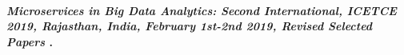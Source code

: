 
\paragraph{
    \textbf{\emph{Microservices in Big Data Analytics: Second International, {ICETCE} 2019, Rajasthan, India, February 1st-2nd 2019, Revised Selected Papers}
    }
    \cite{chaudhary_microservices_2020}.
}



